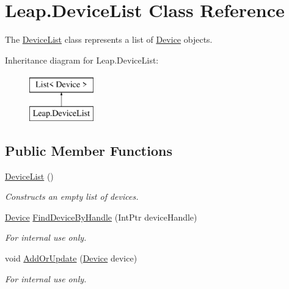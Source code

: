 \hypertarget{class_leap_1_1_device_list}{}\section{Leap.\+Device\+List Class Reference}
\label{class_leap_1_1_device_list}


The \mbox{\hyperlink{class_leap_1_1_device_list}{Device\+List}} class represents a list of \mbox{\hyperlink{class_leap_1_1_device}{Device}} objects.  


Inheritance diagram for Leap.\+Device\+List\+:\begin{figure}[H]
\begin{center}
\leavevmode
\includegraphics[height=2.000000cm]{class_leap_1_1_device_list}
\end{center}
\end{figure}
\subsection*{Public Member Functions}
\begin{DoxyCompactItemize}
\item 
\mbox{\hyperlink{class_leap_1_1_device_list_aa41cad806b6e3b22eed95c6bab9837f8}{Device\+List}} ()
\begin{DoxyCompactList}\small\item\em Constructs an empty list of devices. \end{DoxyCompactList}\item 
\mbox{\hyperlink{class_leap_1_1_device}{Device}} \mbox{\hyperlink{class_leap_1_1_device_list_a99b8acd4484498cc197520a89f287f78}{Find\+Device\+By\+Handle}} (Int\+Ptr device\+Handle)
\begin{DoxyCompactList}\small\item\em For internal use only. \end{DoxyCompactList}\item 
void \mbox{\hyperlink{class_leap_1_1_device_list_aaa399a6ea7549f315760300e5f07fa19}{Add\+Or\+Update}} (\mbox{\hyperlink{class_leap_1_1_device}{Device}} device)
\begin{DoxyCompactList}\small\item\em For internal use only. \end{DoxyCompactList}\end{DoxyCompactItemize}
